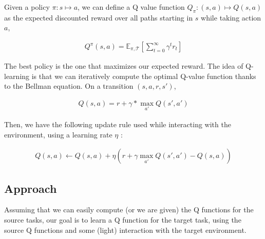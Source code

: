\documentclass{article}
\begin{document}
Given a policy $ \pi : s \mapsto a $, we can define a Q value function $ Q_{\pi} : (s,a) \mapsto Q(s,a) $ as the expected discounted reward over all paths starting in $ s $ while taking action $a$, 

\begin{align*}
Q^{\pi} (s,a) = \mathbb{E}_{\pi, \mathcal{T}} [ \sum_{t=0}^{\infty}\gamma^t r_t]
\end{align*}

The best policy is the one that maximizes our expected reward. The idea of Q-learning is that we can iteratively compute the optimal Q-value function thanks to the Bellman equation. On a transition $(s,a,r,s')$, 

\begin{align*}
Q(s,a) = r + \gamma * \max_{a'} Q(s', a')
\end{align*}

Then, we have the following update rule used while interacting with the environment, using a learning rate $ \eta $ :

\begin{align*}
Q(s, a) \leftarrow Q(s,a) + \eta (r + \gamma \max_{a'}Q(s', a') - Q(s,a))
\end{align*}

\subsection{Approach}\label{sec_approach}

Assuming that we can easily compute (or we are given) the Q functions for the source tasks, our goal is to learn a Q function for the target task, using the source Q functions and some (light) interaction with the target environment. 


\end{document}
